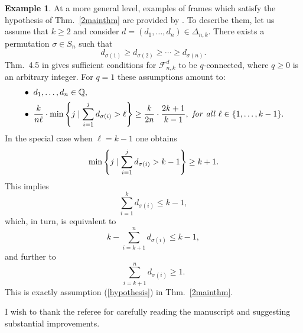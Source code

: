 \documentclass[12pt]{amsart}
\theoremstyle{definition}
\newtheorem{ex}[thm]{Example}
\theoremstyle{remark}
\begin{document}
\begin{ex} \label{exa4}
At a more general level, examples of frames which satisfy the hypothesis of Thm.~\ref{2mainthm}  are provided by \cite[Sect.~4]{CNS}. 
To describe them, let us assume that $k\ge 2$ and consider $d=(d_1, \ldots, d_n) \in \Delta_{n,k}$. 
There exists a permutation $\sigma \in S_n$ such that $$d_{\sigma(1)} \ge d_{\sigma(2)} \ge  \cdots\ge d_{\sigma(n)}.$$ 
Thm.~4.5 in \cite{CNS} gives  sufficient conditions for ${\mathcal F}_{n,k}^d$ to be $q$-connected, where $q\ge 0$ is an arbitrary integer. For $q=1$  these assumptions amount to:
\begin{align*} {}& \bullet \ d_1, \ldots, d_n \in {\mathbb Q},\\
{}& \bullet \ \frac{k}{n\ell} \cdot {\rm min} \left\{ j \mid \sum_{i=1}^jd_{\sigma(i)}>\ell\right\}
\ge \frac{k}{2n}\cdot \frac{2k+1}{k-1}, \ {\it for \ all \ }
\ell \in \{1, \ldots, k-1\}.\end{align*}
In the special case when $\ell = k-1$ one obtains
$${\rm min} \left\{ j \mid \sum_{i=1}^jd_{\sigma(i)}>k-1 \right\}  \ge k+1. $$
This implies 
$$\sum_{i=1}^kd_{\sigma(i)}\le k-1,$$
which, in turn, is equivalent to
$$k-\sum_{i=k+1}^nd_{\sigma(i)} \le k-1,$$
and further to
$$\sum_{i=k+1}^nd_{\sigma(i)}\ge 1.$$
This is exactly assumption (\ref{hypothesis}) in Thm.~\ref{2mainthm}.
\end{ex}

 I wish to thank the referee for carefully reading the manuscript and suggesting substantial improvements.
\end{document}
